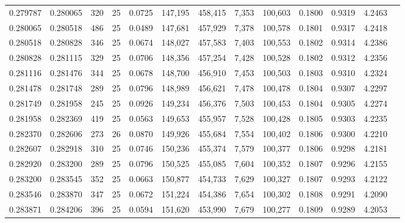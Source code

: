 \begin{tabular}{rrrrrrrrrrrrr}
0.279787 & 0.280065 &   320 &  25 &                                     0.0725 & 147,195 & 458,415 &   7,353 & 100,603 & 0.1800 & 0.9319 & 4.2463 \\
0.280065 & 0.280518 &   486 &  25 &                                     0.0489 & 147,681 & 457,929 &   7,378 & 100,578 & 0.1801 & 0.9317 & 4.2418 \\
0.280518 & 0.280828 &   346 &  25 &                                     0.0674 & 148,027 & 457,583 &   7,403 & 100,553 & 0.1802 & 0.9314 & 4.2386 \\
0.280828 & 0.281115 &   329 &  25 &                                     0.0706 & 148,356 & 457,254 &   7,428 & 100,528 & 0.1802 & 0.9312 & 4.2356 \\
0.281116 & 0.281476 &   344 &  25 &                                     0.0678 & 148,700 & 456,910 &   7,453 & 100,503 & 0.1803 & 0.9310 & 4.2324 \\
0.281478 & 0.281748 &   289 &  25 &                                     0.0796 & 148,989 & 456,621 &   7,478 & 100,478 & 0.1804 & 0.9307 & 4.2297 \\
0.281749 & 0.281958 &   245 &  25 &                                     0.0926 & 149,234 & 456,376 &   7,503 & 100,453 & 0.1804 & 0.9305 & 4.2274 \\
0.281958 & 0.282369 &   419 &  25 &                                     0.0563 & 149,653 & 455,957 &   7,528 & 100,428 & 0.1805 & 0.9303 & 4.2235 \\
0.282370 & 0.282606 &   273 &  26 &                                     0.0870 & 149,926 & 455,684 &   7,554 & 100,402 & 0.1806 & 0.9300 & 4.2210 \\
0.282607 & 0.282918 &   310 &  25 &                                     0.0746 & 150,236 & 455,374 &   7,579 & 100,377 & 0.1806 & 0.9298 & 4.2181 \\
0.282920 & 0.283200 &   289 &  25 &                                     0.0796 & 150,525 & 455,085 &   7,604 & 100,352 & 0.1807 & 0.9296 & 4.2155 \\
0.283200 & 0.283545 &   352 &  25 &                                     0.0663 & 150,877 & 454,733 &   7,629 & 100,327 & 0.1807 & 0.9293 & 4.2122 \\
0.283546 & 0.283870 &   347 &  25 &                                     0.0672 & 151,224 & 454,386 &   7,654 & 100,302 & 0.1808 & 0.9291 & 4.2090 \\
0.283871 & 0.284206 &   396 &  25 &                                     0.0594 & 151,620 & 453,990 &   7,679 & 100,277 & 0.1809 & 0.9289 & 4.2053 \\

\end{tabular}
